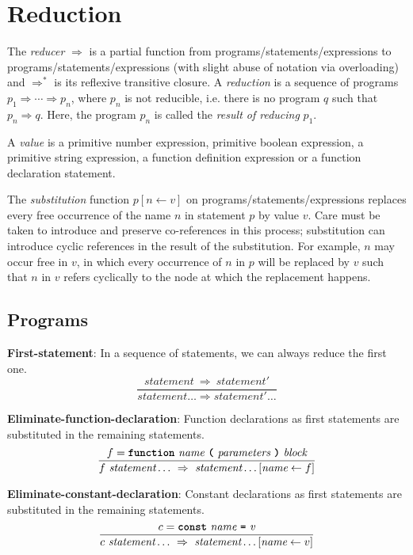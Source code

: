 \section*{Reduction}

The \emph{reducer} $\Rightarrow$ is a partial function from
programs/statements/expressions to
programs/statements/expressions (with slight abuse of notation
via overloading)
and $\Rightarrow^*$ is its reflexive transitive closure.
A \emph{reduction} is a sequence of programs
$p_1 \Rightarrow \cdots \Rightarrow p_n$,
where $p_n$ is not reducible, i.e. there is no
program $q$ such that $p_n \Rightarrow q$.
Here, the program $p_n$ is called the \emph{result
of reducing} $p_1$.

A \emph{value} is a primitive number expression,
primitive boolean expression,
a primitive string expression, a function definition
expression or a function declaration statement.

The \emph{substitution} function 
$p [ n \leftarrow v ]$ on programs/statements/expressions
replaces every free occurrence of the name $n$
in statement $p$ by value $v$. Care must be taken to introduce
and preserve
co-references in this process; substitution can introduce
cyclic references in the result of the substitution. For example,
$n$ may occur free in $v$, in which every occurrence of $n$ in $p$
will be replaced by $v$ such that $n$ in $v$ refers cyclically
to the node at which the replacement happens.

\subsection*{Programs}


\textbf{First-statement}: In a sequence of statements, we can always
reduce the first one.
\[
\frac{
  \textit{statement}\ \Rightarrow\ \textit{statement}'
}{  
  \textit{statement} \ldots
  \Rightarrow 
  \textit{statement}' \ldots
}
\]

\vspace{10mm}

\textbf{Eliminate-function-declaration}: Function declarations as first
statements are substituted in the remaining statements.
\[
\frac{
             f = \textbf{\texttt{function}}\  \textit{name} \ 
                 \textbf{\texttt{(}}\  \textit{parameters}
                 \ \textbf{\texttt{)}}\ \textit{block}
}{
f\ \textit{statement} \ldots\ 
  \Rightarrow\ 
  \textit{statement} \ldots[\textit{name} \leftarrow f]
}
\]

\vspace{10mm}
\textbf{Eliminate-constant-declaration}: Constant declarations as first
statements are substituted in the remaining statements.
\[
\frac{
             c = \textbf{\texttt{const}}\  \textit{name} \ 
             \textbf{\texttt{=}}\  \textit{v}
}{
c\ \textit{statement} \ldots\ 
  \Rightarrow \ 
  \textit{statement} \ldots[\textit{name} \leftarrow v]
}
\]

